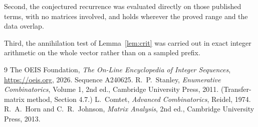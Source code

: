 \documentclass[11pt,a4paper]{article}
\theoremstyle{plain}
\theoremstyle{definition}
\begin{document}
Second, the conjectured recurrence was evaluated directly on those published terms, with no
matrices involved, and holds wherever the proved range and the data overlap.

Third, the annihilation test of Lemma~\ref{lem:crit} was carried out in exact integer
arithmetic on the whole vector rather than on a sampled prefix.

\begin{thebibliography}{9}
 The OEIS Foundation, \emph{The On-Line Encyclopedia of Integer
Sequences}, \url{https://oeis.org}, 2026. Sequence A240625.
 R.~P.~Stanley, \emph{Enumerative Combinatorics}, Volume 1, 2nd ed.,
Cambridge University Press, 2011. (Transfer-matrix method, Section 4.7.)
 L.~Comtet, \emph{Advanced Combinatorics}, Reidel, 1974.
 R.~A.~Horn and C.~R.~Johnson, \emph{Matrix Analysis}, 2nd ed., Cambridge
University Press, 2013.
\end{thebibliography}
\end{document}
